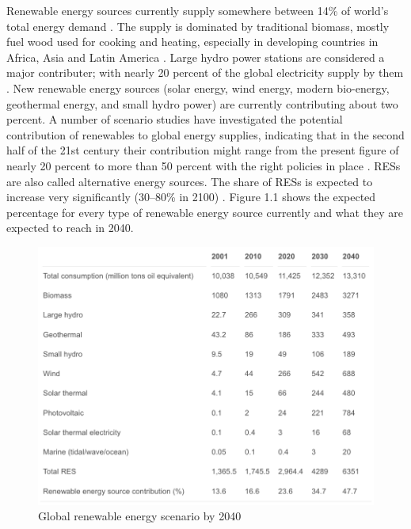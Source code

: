 Renewable energy sources currently supply somewhere between 14\% of world’s total energy demand \cite{panwar2011role}. The supply is dominated by traditional biomass, mostly fuel wood used for cooking and heating, especially in developing countries in Africa, Asia and Latin America \cite{herzog2001renewable}. Large hydro power stations are considered a major contributer; with nearly 20 percent of the global electricity supply by them \cite{panwar2011role}. New renewable energy sources (solar energy, wind energy, modern bio-energy, geothermal energy, and small hydro power) are currently contributing about two percent. A number of scenario studies have investigated the potential contribution of renewables to global energy supplies, indicating that in the second half of the 21st century their contribution might range from the present figure of nearly 20 percent to more than 50 percent with the right policies in place \cite{panwar2011role}. RESs are also called alternative energy sources. The share of RESs is expected to increase very significantly (30–80\% in 2100) \cite{fridleifsson2001geothermal}. Figure 1.1 shows the expected percentage for every type of renewable energy source currently and what they are expected to reach in 2040.
\begin{figure}[H]
\centering
\includegraphics[scale=0.4]{Images/Percentage_of_Renewable_Sources.png}
\caption[Global renewable energy scenario by 2040]{Global renewable energy scenario by 2040 \cite{panwar2011role}}
\end{figure}
